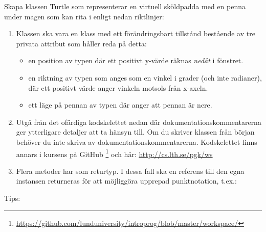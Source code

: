 \Task Skapa klassen Turtle som representerar en virtuell sköldpadda med en penna under magen som kan rita i  enligt nedan riktlinjer:

\begin{enumerate}
\item Klassen  ska vara en klass med ett förändringsbart tillstånd bestående av tre privata attribut som håller reda på detta:

\begin{itemize}
\item en position av typen  där ett positivt y-värde räknas \emph{nedåt} i fönstret.
\item en riktning av typen  som anges som en vinkel i grader  (och inte radianer), där ett positivt värde anger vinkeln motsols från x-axeln.
\item ett läge på pennan av typen  där  anger att pennan är nere.
\end{itemize}

\item Utgå från det ofärdiga kodskelettet nedan där dokumentationskommentarerna ger ytterligare detaljer att ta hänsyn till. Om du skriver klassen från början behöver du inte skriva av dokumentationskommentarerna. Kodskelettet finns annars i kursens  på GitHub%
\footnote{\url{https://github.com/lunduniversity/introprog/blob/master/workspace/}} och här: \url{http://cs.lth.se/pgk/ws}

\item Flera metoder har  som returtyp. I dessa fall ska en referens till den egna instansen returneras för att möjliggöra upprepad punktnotation, t.ex.:\\

\end{enumerate}

\noindent Tips:

